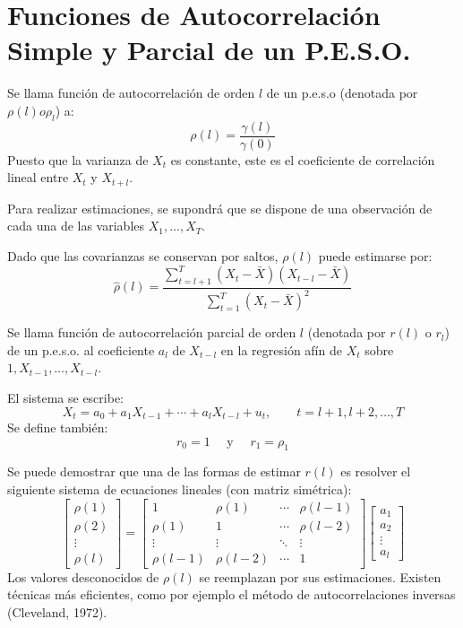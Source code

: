 \section{Funciones de Autocorrelaci\'{o}n Simple y Parcial de un P.E.S.O.}

\begin{definicion}
 Se llama funci\'{o}n de autocorrelaci\'{o}n de orden $l$ de un p.e.s.o (denotada por $\rho \left( l \right) o \rho_{l}$) a:
\[
\rho \left( l \right)=\frac{\gamma (l)}{\gamma (0)}
\]
Puesto que la varianza de $X_{t}$ es constante, este es el coeficiente de correlaci\'{o}n lineal entre $X_{t}$ y $X_{t+l}$.
\end{definicion}

\begin{observacion}
 Para realizar estimaciones, se supondr\'{a} que se dispone de una observaci\'{o}n de cada una de las variables $X_{1},\ldots, X_{T}$.\newline

Dado que las covarianzas se conservan por saltos, $\rho \left( l \right)$ puede estimarse por:
\[
\widehat{\rho }(l)=\frac{\displaystyle \sum_{t=l+1}^T (X_{t}-\bar{X})(X_{t-l}-\bar{X}) }{\displaystyle \sum_{t=1}^T (X_{t}-\bar{X})^{2} }
\]
\end{observacion}

\begin{definicion}
 Se llama funci\'{o}n de autocorrelaci\'{o}n parcial de orden $l$ (denotada por $r\left( l \right)$ o $r_{l}$) de un p.e.s.o. al coeficiente $a_{l}$ de $X_{t-l}$ en la regresi\'{o}n 
af\'{i}n de $X_{t}$ sobre $1, X_{t-1},\ldots, X_{t-l}$.
\end{definicion}

El sistema se escribe:
\[
X_{t}=a_{0}+a_{1}X_{t-1}+\cdots +a_{l}X_{t-l}+u_{t}, \qquad t=l+1, l+2,\ldots ,T
\]
Se define tambi\'{e}n:
\[
 r_{0} =1\quad\text{ y }\quad r_{1} =\rho_{1}
\]

Se puede demostrar que una de las formas de estimar $r(l)$ es resolver el siguiente sistema de ecuaciones lineales (con matriz sim\'{e}trica):
\[
\begin{bmatrix}
	\rho (1)\\
	\rho (2)\\
	\vdots \\
	\rho (l)
\end{bmatrix}
=
\begin{bmatrix}
	1 & \rho(1) & \cdots & \rho (l-1)\\
	\rho(1) & 1 & \cdots & \rho (l-2)\\
	\vdots & \vdots &\ddots & \vdots \\
	\rho (l-1) & \rho (l-2) & \cdots & 1
\end{bmatrix}
\begin{bmatrix}
	a_{1}\\
	a_{2}\\
	\vdots \\
	a_{l}
\end{bmatrix}
\]
Los valores desconocidos de $\rho \left( l \right)$ se reemplazan por sus estimaciones. Existen t\'{e}cnicas m\'{a}s eficientes, como por ejemplo el m\'{e}todo de autocorrelaciones inversas (Cleveland, 1972).

